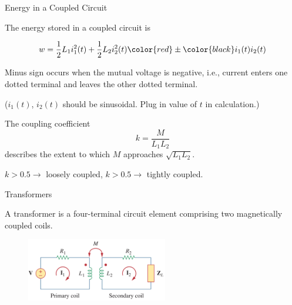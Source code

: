 \documentclass{beamer}
\begin{document}
\begin{frame}{Energy in a Coupled Circuit}

The energy stored in a coupled circuit is

$$w = \frac12L_1i_1^2(t)+\frac12L_2i_2^2(t) \color{red}\pm\color{black} i_1(t)i_2(t)$$

Minus sign occurs when the mutual voltage is negative, i.e., current enters one dotted terminal and leaves the other dotted terminal.

\begin{small}
   ($i_1(t)$, $i_2(t)$ should be sinusoidal. Plug in value of $t$ in calculation.)
\end{small}


\vspace{0.3cm}
\noalign \hline
\vspace{0.3cm}

The coupling coefficient 
$$k = \frac{M}{L_1L_2}$$
describes the extent to which $M$ approaches $\sqrt{L_1L_2}$.

$k > 0.5 \rightarrow$ loosely coupled, $k > 0.5 \rightarrow$ tightly coupled.


\end{frame}






\begin{frame}{Transformers}

A transformer is a four-terminal circuit element comprising two magnetically coupled coils.

\begin{figure}[H]
    \centering
    \includegraphics[width=0.55\textwidth]{C13/lin tra.png}
\end{figure}




\end{frame}
\end{document}
